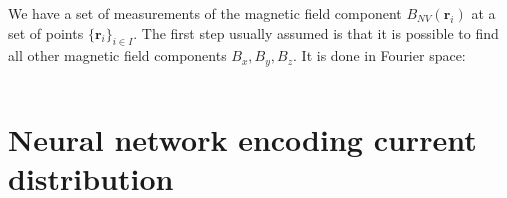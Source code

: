 \documentclass[justified]{tufte-handout}
\begin{document}
We have a set of measurements of the magnetic field component $B_{NV}(\mathbf{r}_i)$ at a set of points $\{\mathbf{r}_i\}_{i\in I}$. The first step usually assumed is that it is possible to find all other magnetic field components $B_x, B_y, B_z$. It is done in Fourier space:

\begin{equation}
\end{equation}

\section{Neural network encoding current distribution}

\cite{wang2021} 
\end{document}
